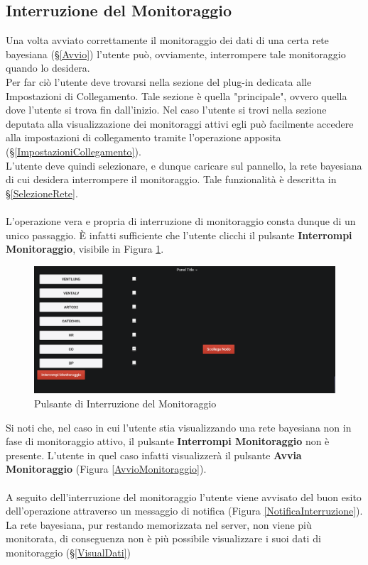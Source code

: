 \subsection{Interruzione del Monitoraggio}\label{Interruzione}

Una volta avviato correttamente il monitoraggio dei dati di una certa rete bayesiana (§\ref{Avvio}) l'utente può, ovviamente, interrompere tale monitoraggio quando lo desidera.\\
Per far ciò l'utente deve trovarsi nella sezione del plug-in dedicata alle Impostazioni di Collegamento. Tale sezione è quella "principale", ovvero quella dove l'utente si trova fin dall'inizio. Nel caso l'utente si trovi nella sezione deputata alla visualizzazione dei monitoraggi attivi egli può facilmente accedere alla impostazioni di collegamento tramite l'operazione apposita (§\ref{ImpostazioniCollegamento}).\\
L'utente deve quindi selezionare, e dunque caricare sul pannello, la rete bayesiana di cui desidera interrompere il monitoraggio. Tale funzionalità è descritta in §\ref{SelezioneRete}.\\
~\\
L'operazione vera e propria di interruzione di monitoraggio consta dunque di un unico passaggio. È infatti sufficiente che l'utente clicchi il pulsante \textbf{Interrompi Monitoraggio}, visibile in Figura \ref{InterruzioneMonitoraggio}.

\begin{figure}[H]
	\begin{center}
		\includegraphics[scale=0.4]{./images/InterruzioneMonitoraggio.png}
		 \caption{Pulsante di Interruzione del Monitoraggio}	
		 \label{InterruzioneMonitoraggio}
	\end{center}
\end{figure}

Si noti che, nel caso in cui l'utente stia visualizzando una rete bayesiana non in fase di monitoraggio attivo, il pulsante \textbf{Interrompi Monitoraggio} non è presente. L'utente in quel caso infatti visualizzerà il pulsante \textbf{Avvia Monitoraggio} (Figura \ref{AvvioMonitoraggio}).\\
~\\
A seguito dell'interruzione del monitoraggio l'utente viene avvisato del buon esito dell'operazione attraverso un messaggio di notifica (Figura \ref{NotificaInterruzione}). La rete bayesiana, pur restando memorizzata nel server, non viene più monitorata, di conseguenza non è più possibile visualizzare i suoi dati di monitoraggio (§\ref{VisualDati})

